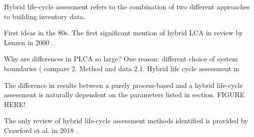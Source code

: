 \documentclass{article}
\begin{document}
        Hybrid life-cycle assessment refers to the combination of two different approaches to building inventory data. 
        
        First ideas in the 80s. The first significant mention of hybrid LCA in review by Lenzen in 2000 \cite{lenzen_errors_2000}.
            
        Why are differences in PLCA so large? One reason: different choice of system boundaries ( compare 2. Method and data 2.1. Hybrid life cycle assessment in \cite{teh_hybrid_2017}
        
        The difference in results between a purely process-based and a hybrid life-cycle assessment is naturally dependent on the parameters listed in section. FIGURE HERE!
        
        The only review of hybrid life-cycle assessment methods identified is provided by Crawford et al. in 2018 \cite{crawford_hybrid_2018}. \cite{}
        
\end{document}
